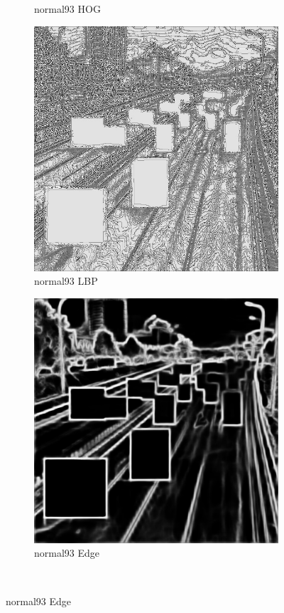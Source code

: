 \documentclass[a4paper, 10pt]{article}
\begin{document}
\begin{figure}[htbp]
\begin{subfigure}{0.24\textwidth}
			\caption*{normal93 HOG}
			\label{fig: normal93 HOG}
		\end{subfigure}	
		\begin{subfigure}{0.24\textwidth}
			\includegraphics[width=\linewidth]{picture/alldata_filled_lbp/normal93}
			\caption*{normal93 LBP}
			\label{fig: normal93 LBP}
		\end{subfigure}
		\begin{subfigure}{0.24\textwidth}
			\includegraphics[width=\linewidth]{picture/alldata_filled_edge/normal93}
			\caption*{normal93 Edge}
			\label{fig: normal93 Edge}
		\end{subfigure}	\\
		

\end{figure}
\end{document}
